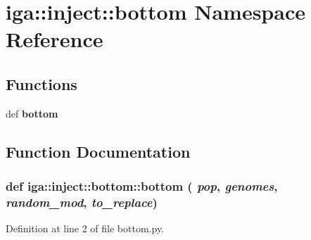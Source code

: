 \section{iga::inject::bottom Namespace Reference}
\label{namespaceiga_1_1inject_1_1bottom}


\subsection*{Functions}
\begin{CompactItemize}
\item 
def {\bf bottom}
\end{CompactItemize}


\subsection{Function Documentation}
\subsubsection{\setlength{\rightskip}{0pt plus 5cm}def iga::inject::bottom::bottom ( {\em pop},  {\em genomes},  {\em random\_\-mod},  {\em to\_\-replace})}\label{namespaceiga_1_1inject_1_1bottom_f852da5b88e175b43869dd8c77f13caa}




Definition at line 2 of file bottom.py.